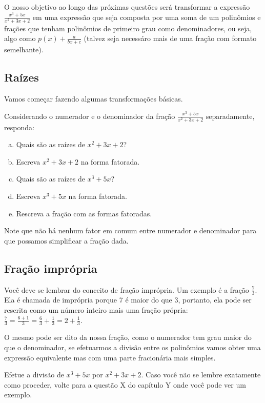 \documentclass[main_estudante.tex]{subfiles}
\begin{document}
O nosso objetivo ao longo das próximas questões será transformar a expressão $\frac{x^3+5x}{x^2+3x+2}$ em uma expressão que seja composta por uma soma de um polinômios e frações que tenham polinômios de primeiro grau como denominadores, ou seja, algo como $p(x)+\frac{a}{bx+c}$ (talvez seja necessáro mais de uma fração com formato semelhante).

\subsection*{Raízes}

Vamos começar fazendo algumas transformações básicas.

\begin{questao}
Considerando o numerador e o denominador da fração $\frac{x^3+5x}{x^2+3x+2}$ separadamente, responda:
\begin{enumerate}[a)]
\item Quais são as raízes de $x^2+3x+2$?
\item Escreva $x^2+3x+2$ na forma fatorada.
\item Quais são as raízes de $x^3+5x$?
\item Escreva $x^3+5x$ na forma fatorada.
\item Rescreva a fração com as formas fatoradas.
\end{enumerate}
\end{questao}

Note que não há nenhum fator em comum entre numerador e denominador para que possamos simplificar a fração dada.

\subsection*{Fração imprópria}

Você deve se lembrar do conceito de fração imprópria. Um exemplo é a fração $\frac{7}{3}$. Ela é chamada de imprópria porque 7 é maior do que 3, portanto, ela pode ser rescrita como um número inteiro mais uma fração própria:$\frac{7}{3}=\frac{6+1}{3}=\frac{6}{3}+\frac{1}{3}=2+\frac{1}{3}$.

O mesmo pode ser dito da nossa fração, como o numerador tem grau maior do que o denominador, se efetuarmos a divisão entre os polinômios vamos obter uma expressão equivalente mas com uma parte fracionária mais simples.

\begin{questao}
Efetue a divisão de ${x^3+5x}$ por ${x^2+3x+2}$. Caso você não se lembre exatamente como proceder, volte para a questão X do capítulo Y onde você pode ver um exemplo.
\end{questao}
\end{document}
